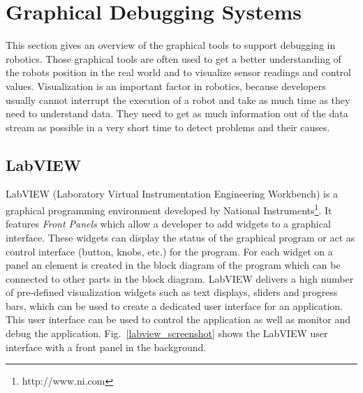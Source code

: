 

\section{Graphical Debugging Systems}
This section gives an overview of the graphical tools to support debugging in robotics. Those graphical tools are often used to get a better understanding of the robots position in the real world and to visualize sensor readings and control values. Visualization is an important factor in robotics, because developers usually cannot interrupt the execution of a robot and take as much time as they need to understand data. They need to get as much information out of the data stream as possible in a very short time to detect problems and their causes.

\subsection{LabVIEW}

LabVIEW (Laboratory Virtual Instrumentation Engineering Workbench) is a graphical programming environment developed by National Instruments\footnote{http://www.ni.com}. It features \emph{Front Panels} which allow a developer to add widgets to a graphical interface. These widgets can display the status of the graphical program or act as control interface (button, knobs, etc.) for the program. For each widget on a panel an element is created in the block diagram of the program which can be connected to other parts in the block diagram. LabVIEW delivers a high number of pre-defined visualization widgets such as text displays, sliders and progress bars, which can be used to create a dedicated user interface for an application. This user interface can be used to control the application as well as monitor and debug the application. Fig.~\ref{labview_screenshot} shows the LabVIEW user interface with a front panel in the background.

